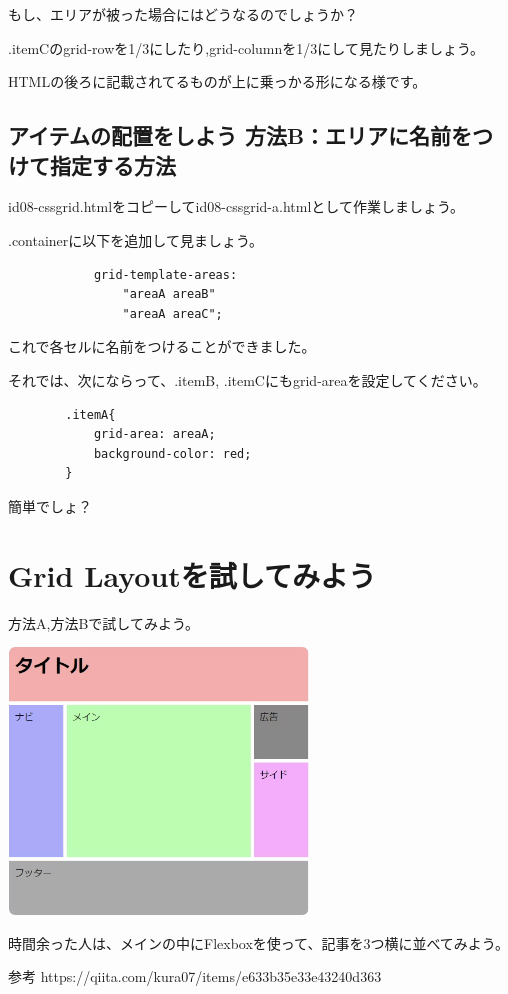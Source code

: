 \documentclass[mingoth,11pt,a4j,uplatex,dvipdfmx]{jsarticle}
\begin{document}
もし、エリアが被った場合にはどうなるのでしょうか？

.itemCのgrid-rowを1/3にしたり,grid-columnを1/3にして見たりしましょう。

HTMLの後ろに記載されてるものが上に乗っかる形になる様です。

\subsection{アイテムの配置をしよう 方法B：エリアに名前をつけて指定する方法}
id08-cssgrid.htmlをコピーしてid08-cssgrid-a.htmlとして作業しましょう。

.containerに以下を追加して見ましょう。
\begin{lstlisting}
            grid-template-areas: 
                "areaA areaB"
                "areaA areaC";
\end{lstlisting}
これで各セルに名前をつけることができました。

それでは、次にならって、.itemB, .itemCにもgrid-areaを設定してください。
\begin{lstlisting}
        .itemA{
            grid-area: areaA;
            background-color: red;
        }
\end{lstlisting}

簡単でしょ？

\section{Grid Layoutを試してみよう}
方法A,方法Bで試してみよう。

\includegraphics[width=8cm]{img/3column.png}

時間余った人は、メインの中にFlexboxを使って、記事を3つ横に並べてみよう。

参考
https://qiita.com/kura07/items/e633b35e33e43240d363











\end{document}
